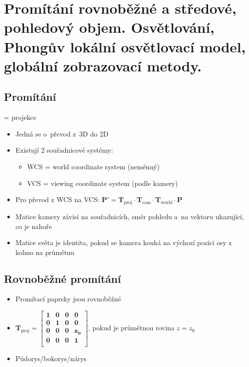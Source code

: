 \section{Promítání rovnoběžné a středové, pohledový objem. Osvětlování, Phongův lokální osvětlovací model, globální zobrazovací metody.}
\subsection{Promítání}
= projekce

\begin{itemize}
    \item Jedná se o~převod z~3D do 2D
    \item Existují 2 souřadnicové systémy:
    \begin{itemize}
        \item WCS = world coordinate system (neměnný)
        \item VCS = viewing coordinate system (podle kamery)
    \end{itemize}
    \item Pro převod z WCS na VCS: \(\mathbf{P}'=\mathbf{T_\mathrm{proj}}\cdot\mathbf{T}_\mathrm{cam}\cdot\mathbf{T}_\mathrm{world}\cdot\mathbf{P}\)
    \item Matice kamery závisí na souřadnicích, směr pohledu a~na vektoru ukazující, co je nahoře
    \item Matice světa je identita, pokud se kamera kouká na výchozí pozici osy z kolmo na průmětnu
\end{itemize}

\subsection{Rovnoběžné promítání}
\begin{itemize}
    \item Promítací paprsky jsou rovnoběžné
    \item \(\mathbf{T_\mathrm{proj}=\begin{bmatrix}
        1 & 0 & 0 & 0 \\
        0 & 1 & 0 & 0 \\
        0 & 0 & 0 & z_0 \\
        0 & 0 & 0 & 1 \\
    \end{bmatrix}}\), pokud je průmětnou rovina \(z=z_0\)
    \item Půdorys/bokorys/nárys
\end{itemize}

